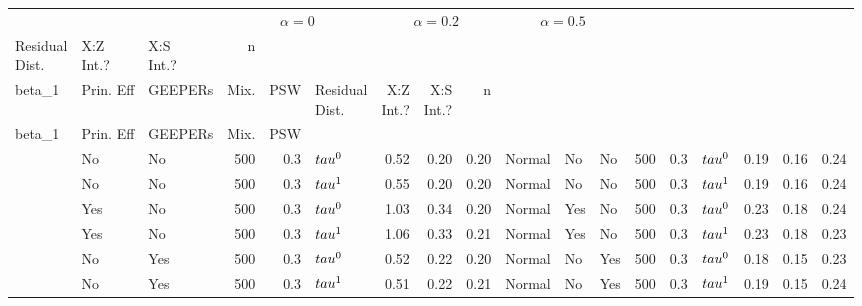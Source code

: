 
\begin{tabular}[t]{lllrrlrrrlllrrlrrr}
\toprule
\multicolumn{3}{c}{ } & \multicolumn{3}{c}{$\alpha=0$} & \multicolumn{3}{c}{$\alpha=0.2$} & \multicolumn{3}{c}{$\alpha=0.5$} \\
\cmidrule(l{3pt}r{3pt}){4-6} \cmidrule(l{3pt}r{3pt}){7-9} \cmidrule(l{3pt}r{3pt}){10-12}
\makecell[l]{Residual\\Dist.} & \makecell[c]{X:Z\\Int.?} & \makecell[r]{X:S\\Int.?} & n & \\beta_1 & Prin. Eff & GEEPERs & Mix. & PSW & \makecell[l]{Residual\\Dist.} & \makecell[c]{X:Z\\Int.?} & \makecell[r]{X:S\\Int.?} & n & \\beta_1 & Prin. Eff & GEEPERs & Mix. & PSW\\
\midrule
 & No & No & 500 & 0.3 & $\\tau^0$ & 0.52 & 0.20 & 0.20 & Normal & No & No & 500 & 0.3 & $\\tau^0$ & 0.19 & 0.16 & 0.24\\

 & No & No & 500 & 0.3 & $\\tau^1$ & 0.55 & 0.20 & 0.20 & Normal & No & No & 500 & 0.3 & $\\tau^1$ & 0.19 & 0.16 & 0.24\\

 & Yes & No & 500 & 0.3 & $\\tau^0$ & 1.03 & 0.34 & 0.20 & Normal & Yes & No & 500 & 0.3 & $\\tau^0$ & 0.23 & 0.18 & 0.24\\

 & Yes & No & 500 & 0.3 & $\\tau^1$ & 1.06 & 0.33 & 0.21 & Normal & Yes & No & 500 & 0.3 & $\\tau^1$ & 0.23 & 0.18 & 0.23\\

 & No & Yes & 500 & 0.3 & $\\tau^0$ & 0.52 & 0.22 & 0.20 & Normal & No & Yes & 500 & 0.3 & $\\tau^0$ & 0.18 & 0.15 & 0.23\\

 & No & Yes & 500 & 0.3 & $\\tau^1$ & 0.51 & 0.22 & 0.21 & Normal & No & Yes & 500 & 0.3 & $\\tau^1$ & 0.19 & 0.15 & 0.24\\


\end{tabular}
